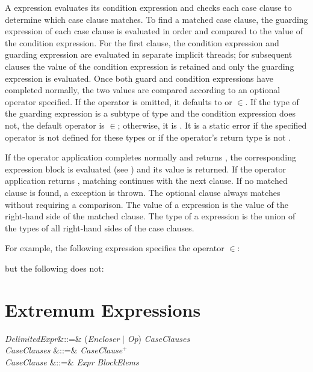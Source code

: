 A  expression evaluates its condition expression and checks
each case clause to determine which case clause matches.  To find a
matched case clause, the guarding expression of each case clause is
evaluated in order and compared to the value of the condition
expression.  For the first clause, the condition expression and
guarding expression are evaluated in separate implicit threads; for
subsequent clauses the value of the condition expression is retained
and only the guarding expression is evaluated.  Once both guard and
condition expressions have completed normally, the two values are
compared according to an optional operator specified.  If the
operator is omitted, it defaults to \EXP{=} or $\in$.
If the type of the guarding expression is a subtype of type 
and the condition expression does not,
the default operator is $\in$;
otherwise, it is \EXP{=}.
It is a static error
if the specified operator is not defined for these types
or if the operator's return type is not .

If the operator application completes normally and returns , the
corresponding expression block is evaluated (see )
and its value is returned.  If the operator application returns ,
matching continues with the next clause.
If no matched clause is found, a  exception is thrown.
The optional  clause always matches without requiring a comparison.
The value of a  expression is the value of the right-hand side
of the matched clause.  The type of a  expression is the
union of the types of all right-hand sides of the case clauses.

For example, the following  expression specifies the operator
$\in$:

but the following does not:




\section{Extremum Expressions}


\begin{Grammar}
\emph{DelimitedExpr}&::=&
  (\emph{Encloser} $|$ \emph{Op}) 
\emph{CaseClauses} \\
\emph{CaseClauses} &::=& \emph{CaseClause}$^+$\\

\emph{CaseClause} &::=& \emph{Expr} \EXP{\Rightarrow} \emph{BlockElems}\\
\end{Grammar}

